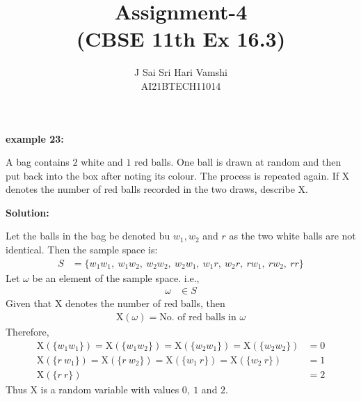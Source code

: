 \documentclass[journal,12pt,twocolumn]{article}\usepackage[margin=1.25 in]{geometry}
\title{\LARGE{\textbf{Assignment-4}\\(CBSE 11th Ex 16.3)}}
\author{\normalsize J Sai Sri Hari Vamshi\\ \footnotesize AI21BTECH11014}
\date{}
\providecommand{\x}[1]{\ensuremath{\text{X}\left(#1\right)}}
\begin{document}
\maketitle
\begin{center}
    \textbf{\large example 23:}
\end{center}

\noindent A bag contains $2$ white and $1$ red balls. One ball is drawn at random and then put back into the box after noting its colour. The process is repeated again. If X denotes the number of red balls recorded in the two draws, describe X.

\begin{center}
    \textbf{\large Solution:}
\end{center}

\noindent Let the balls in the bag be denoted bu $w_1, w_2$ and $r$ as the two white balls are not identical.
\noindent Then the sample space is:
	\begin{align*}
	S & = \{w_1 w_1,\ w_1 w_2,\ w_2 w_2,\ w_2 w_1,\ w_1 r,\ w_2 r,\ r w_1,\ r 	w_2,\ r r\}
	\end{align*}
\noindent Let $\omega$ be an element of the sample space. i.e.,
	\begin{align*}
	\omega & \in S
	\end{align*}
\noindent Given that X denotes the number of red balls, then 
	\begin{align*}
	\x{\omega} = \text{No. of red balls in }\omega
	\end{align*}
\noindent Therefore,
	\begin{align*}
	\x{\{w_1 w_1\}} = \x{\{w_1 w_2\}} = \x{\{w_2 w_1\}} = \x{\{w_2 w_2\}} & = 0\\
	\x{\{r\ w_1\}} = \x{\{r\ w_2\}} = \x{\{w_1\ r\}} = \x{\{w_2\ r\}} & = 1\\
	\x{\{r\ r\}} & = 2
	\end{align*}
\noindent Thus X is a random variable with values $0,\ 1$ and $2$.
\end{document}
